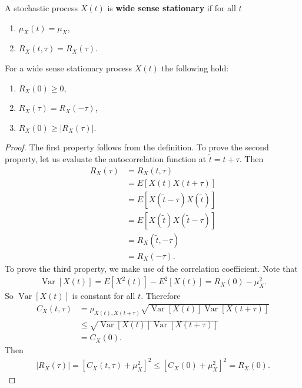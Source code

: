 \documentclass{memoir}
\newcommand{\Var}{\operatorname{Var}}
\begin{document}
\begin{definition}
    A stochastic process $X(t)$ is \textbf{wide sense stationary} if for all $t$
    \begin{enumerate}
        \item $\mu_X(t) = \mu_X$,
        \item $R_X(t,\tau)  =R_X(\tau)$.
    \end{enumerate}
\end{definition}

\begin{theorem}
    For a wide sense stationary process $X(t)$ the following hold:
    \begin{enumerate}
        \item $R_X(0) \ge 0$,
        \item $R_X(\tau) = R_X(-\tau)$,
        \item $R_X(0) \ge |R_X(\tau)|$.
    \end{enumerate}
\end{theorem}
\begin{proof}
    The first property follows from the definition. To prove the second property, let us evaluate the autocorrelation function at $\tilde{t} = t + \tau$. Then
    \begin{align*}
        R_X(\tau) &= R_X(t,\tau)\\
        &= E[X(t)X(t+\tau)]\\
        &= E[X(\tilde{t} - \tau) X(\tilde{t})]\\
        &= E[X(\tilde{t}) X(\tilde{t} - \tau)]\\
        &= R_X(\tilde{t}, - \tau)\\
        &= R_X(-\tau).
    \end{align*}
    To prove the third property, we make use of the correlation coefficient. Note that
    \begin{align*}
        \Var[X(t)] = E[X^2(t)] -E^2[X(t)] = R_X(0) - \mu_X^2.
    \end{align*}
    So $\Var[X(t)]$ is constant for all $t$. Therefore
    \begin{align*}
        C_X(t,\tau) &= \rho_{X(t),X(t+\tau)} \sqrt{\Var[X(t)]\Var[X(t+\tau)]}\\
        &\le \sqrt{\Var[X(t)]\Var[X(t+\tau)]}\\
        &= C_X(0).
    \end{align*}
    Then
    \begin{align*}
        |R_X(\tau)| = [ C_X(t,\tau) + \mu_X^2]^2 \le [C_X(0) + \mu_X^2]^2 = R_X(0).
    \end{align*}
\end{proof}
\end{document}
